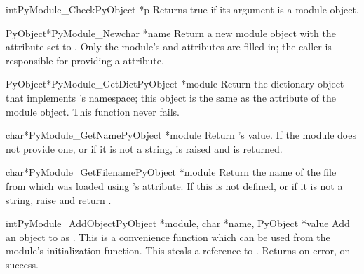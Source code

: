\documentclass{manual}
\begin{document}
\begin{cfuncdesc}{int}{PyModule_Check}{PyObject *p}
Returns true if its argument is a module object.
\end{cfuncdesc}

\begin{cfuncdesc}{PyObject*}{PyModule_New}{char *name}
Return a new module object with the  attribute set to
.  Only the module's  and
 attributes are filled in; the caller is responsible
for providing a  attribute.
\end{cfuncdesc}

\begin{cfuncdesc}{PyObject*}{PyModule_GetDict}{PyObject *module}
Return the dictionary object that implements 's namespace; 
this object is the same as the  attribute of the
module object.  This function never fails.
\end{cfuncdesc}

\begin{cfuncdesc}{char*}{PyModule_GetName}{PyObject *module}
Return 's  value.  If the module does not 
provide one, or if it is not a string,  is
raised and \NULL{} is returned.
\end{cfuncdesc}

\begin{cfuncdesc}{char*}{PyModule_GetFilename}{PyObject *module}
Return the name of the file from which  was loaded using
's  attribute.  If this is not defined,
or if it is not a string, raise  and return
\NULL.
\end{cfuncdesc}

\begin{cfuncdesc}{int}{PyModule_AddObject}{PyObject *module,
                                           char *name, PyObject *value}
Add an object to  as .  This is a convenience
function which can be used from the module's initialization function.
This steals a reference to .  Returns  on error,
 on success.
\end{cfuncdesc}
\end{document}
